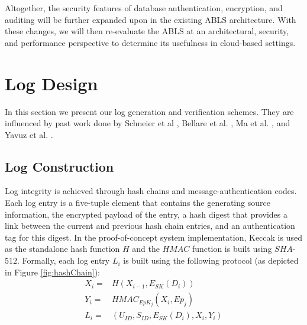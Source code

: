 \documentclass{sig-alternate}
\begin{document}
Altogether, the security features of database authentication, encryption, and auditing will be further expanded upon
in the existing ABLS architecture. With these changes, we will then re-evaluate the ABLS at an architectural, security, 
and performance perspective to determine its usefulness in cloud-based settings. 

\section{Log Design}
In this section we present our log generation and verification schemes.
They are influenced by past work done by Schneier et al \cite{Schneier1999-Secure},
Bellare et al. \cite{Bellare1997-ForwardIntegrity}, Ma et al. \cite{Ma2008-FssAgg},
and Yavuz et al. \cite{Yavuz2009-BAF}. 

\subsection{Log Construction}
\label{sec:LogConstruction}

Log integrity is achieved through hash chains and message-authentication codes. 
Each log entry is a five-tuple element that contains the generating source
information, the encrypted payload of the entry, a hash digest that provides
a link between the current and previous hash chain entries, and an authentication tag for this digest. In the proof-of-concept
system implementation, Keccak is used as the standalone hash function $H$
and the $HMAC$ function is built using $SHA$-$512$. 
Formally, each log entry $L_i$ is built using the following protocol (as depicted in Figure \ref{fig:hashChain}):
\begin{align*}
X_i = & H(X_{i - 1}, E_{SK}(D_i)) \\ %
Y_i = & HMAC_{EpK_{j}}(X_i, Ep_{j}) \\ %
L_i = & (U_{ID}, S_{ID}, E_{SK}(D_i), X_i, Y_i) %
\end{align*}
\end{document}
